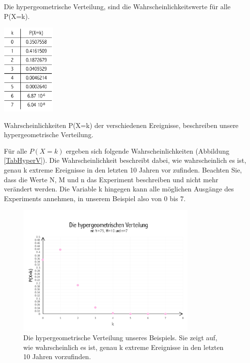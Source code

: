 \begin{refsection}
\begin{definition}
Die hypergeometrische Verteilung, sind die Wahrscheinlichkeitswerte für alle P(X=k).
\end{definition}

\begin{table}
\centering
\includegraphics[width=0.2\textwidth]{extrem/TabHyperV.pdf}
\caption{Wahrscheinlichkeiten P(X=k) der verschiedenen Ereignisse, beschreiben unsere hypergeometrische Verteilung.}
\label{TabHyperV}
\end{table}

Für alle $P (X=k)$ ergeben sich folgende Wahrscheinlichkeiten (Abbildung \ref{TabHyperV}). Die Wahrscheinlichkeit beschreibt dabei, wie wahrscheinlich es ist, genau k extreme Ereignisse in den letzten 10 Jahren vor zufinden.
Beachten Sie, dass die Werte N, M und n das Experiment beschreiben und nicht mehr verändert werden. Die Variable k hingegen kann alle möglichen Ausgänge des Experiments annehmen, in unserem Beispiel also von 0 bis 7.

\begin{figure}
\centering
\includegraphics[width=0.8\textwidth]{extrem/HyperV.pdf}
\caption{Die hypergeometrische Verteilung unseres Beispiels. Sie zeigt auf, wie wahrscheinlich es ist, genau k extreme Ereignisse in den letzten 10 Jahren vorzufinden.}
\label{HyperV}
\end{figure}


\end{refsection}
